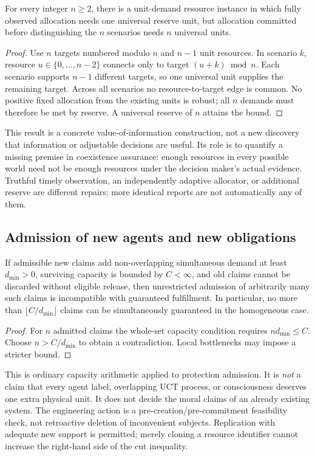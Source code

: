 \begin{corollary}
For every integer $n\geq2$, there is a unit-demand resource instance in which fully observed allocation needs one universal reserve unit, but allocation committed before distinguishing the $n$ scenarios needs $n$ universal units.
\end{corollary}
\begin{proof}
Use $n$ targets numbered modulo $n$ and $n-1$ unit resources. In scenario $k$, resource $u\in\{0,\ldots,n-2\}$ connects only to target $(u+k)\bmod n$. Each scenario supports $n-1$ different targets, so one universal unit supplies the remaining target. Across all scenarios no resource-to-target edge is common. No positive fixed allocation from the existing units is robust; all $n$ demands must therefore be met by reserve. A universal reserve of $n$ attains the bound.
\end{proof}
This result is a concrete value-of-information construction, not a new discovery that information or adjustable decisions are useful. Its role is to quantify a missing premise in coexistence assurance: enough resources in every possible world need not be enough resources under the decision maker's actual evidence. Truthful timely observation, an independently adaptive allocator, or additional reserve are different repairs; more identical reports are not automatically any of them.

\subsection{Admission of new agents and new obligations}
\begin{corollary}
If admissible new claims add non-overlapping simultaneous demand at least $d_{\min}>0$, surviving capacity is bounded by $C<\infty$, and old claims cannot be discarded without eligible release, then unrestricted admission of arbitrarily many such claims is incompatible with guaranteed fulfillment. In particular, no more than $\lfloor C/d_{\min}\rfloor$ claims can be simultaneously guaranteed in the homogeneous case.
\end{corollary}
\begin{proof}
For $n$ admitted claims the whole-set capacity condition requires $nd_{\min}\leq C$. Choose $n> C/d_{\min}$ to obtain a contradiction. Local bottlenecks may impose a stricter bound.
\end{proof}
This is ordinary capacity arithmetic applied to protection admission. It is \emph{not} a claim that every agent label, overlapping UCT process, or consciousness deserves one extra physical unit. It does not decide the moral claims of an already existing system. The engineering action is a pre-creation/pre-commitment feasibility check, not retroactive deletion of inconvenient subjects. Replication with adequate new support is permitted; merely cloning a resource identifier cannot increase the right-hand side of the cut inequality.

